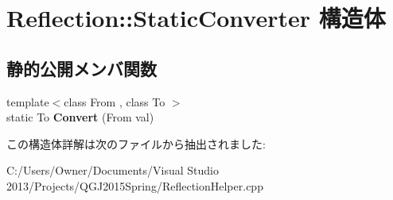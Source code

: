 \hypertarget{struct_reflection_1_1_static_converter}{}\section{Reflection\+:\+:Static\+Converter 構造体}
\label{struct_reflection_1_1_static_converter}
\subsection*{静的公開メンバ関数}
\begin{DoxyCompactItemize}
\item 
{\footnotesize template$<$class From , class To $>$ }\\static To {\bfseries Convert} (From val)\hypertarget{struct_reflection_1_1_static_converter_ad10f38307ab7aa1efc5bd5853e16e122}{}\label{struct_reflection_1_1_static_converter_ad10f38307ab7aa1efc5bd5853e16e122}

\end{DoxyCompactItemize}


この構造体詳解は次のファイルから抽出されました\+:\begin{DoxyCompactItemize}
\item 
C\+:/\+Users/\+Owner/\+Documents/\+Visual Studio 2013/\+Projects/\+Q\+G\+J2015\+Spring/Reflection\+Helper.\+cpp\end{DoxyCompactItemize}
